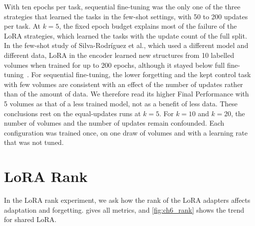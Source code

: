 With ten epochs per task, sequential fine-tuning was the only one of the three strategies that learned the tasks in the few-shot settings, with 50 to 200 updates per task.
At $k = 5$, the fixed epoch budget explains most of the failure of the LoRA strategies, which learned the tasks with the update count of the full split.
In the few-shot study of Silva-Rodríguez et al., which used a different model and different data, LoRA in the encoder learned new structures from 10 labelled volumes when trained for up to 200 epochs, although it stayed below full fine-tuning~\cite[Sec.~4.3.2, Table~4]{silvarodriguez2023fseft}.
For sequential fine-tuning, the lower forgetting and the kept control task with few volumes are consistent with an effect of the number of updates rather than of the amount of data.
We therefore read its higher Final Performance with 5 volumes as that of a less trained model, not as a benefit of less data.
These conclusions rest on the equal-updates runs at $k = 5$.
For $k = 10$ and $k = 20$, the number of volumes and the number of updates remain confounded.
Each configuration was trained once, on one draw of volumes and with a learning rate that was not tuned.

\section{LoRA Rank}
\label{sec:exp-rank}
In the LoRA rank experiment, we ask how the rank of the LoRA adapters affects adaptation and forgetting.
 gives all metrics, and \cref{fig:ch6_rank} shows the trend for shared LoRA.

\begin{table}[tb]
\centering
\caption[Results of the LoRA rank experiment]{Results of the LoRA rank experiment (full training split, original task order, one run each). Mean \gls{dsc}; Adapt.: Adaptation; Forg.: Final Forgetting; Ctrl.\ drop: control-task drop; Final: Final Performance; Transf.: Transfer. $\uparrow$/$\downarrow$: higher/lower is better. Bold: best of the seven ranks of shared LoRA in each column. $^{\dagger}$: zero or near zero by construction (\cref{subsec:method-lora}), not ranked.}
\label{tab:ch6_rank}

\end{table}

